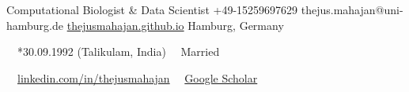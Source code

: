 \documentclass{thejus_cv}
\begin{document}
         {Computational Biologist \& Data Scientist}
         {+49-15259697629}
         {thejus.mahajan@uni-hamburg.de}
         {\href{https://thejusmahajan.github.io}{thejusmahajan.github.io}}
         {Hamburg, Germany}

\vspace{-0.5cm}
{\small\color{white}
\faCalendar\ \ *30.09.1992 (Talikulam, India) \hspace{0.5cm} \faUser\ \ Married
}\par
\vspace{0.1cm}
{\small\color{white}
\faLinkedin\ \ \href{https://www.linkedin.com/in/thejusmahajan/}{linkedin.com/in/thejusmahajan}
\hspace{0.5cm}
\faGraduationCap\ \ \href{https://scholar.google.com/citations?user=PJkZwAwAAAAJ}{Google Scholar}
}\par
\vspace{0.1cm}
\end{document}
